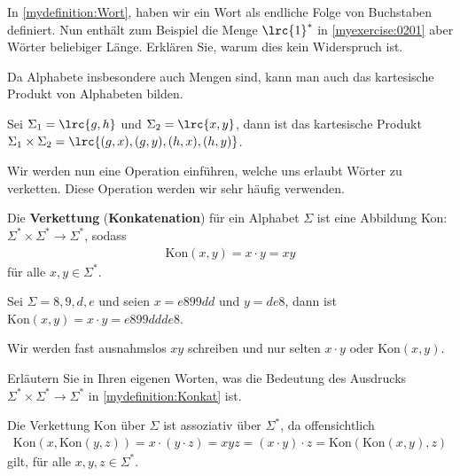 \begin{myexercise}\label{myexercise:0202}
	In \cref{mydefinition:Wort}, haben wir ein Wort als endliche Folge von Buchstaben definiert. Nun enthält zum Beispiel die Menge $\lrc{1}^{*}$ in \cref{myexercise:0201} aber Wörter beliebiger Länge. Erklären Sie, warum dies kein Widerspruch ist.
\end{myexercise}

Da Alphabete insbesondere auch Mengen sind, kann man auch das kartesische Produkt von Alphabeten bilden.

\begin{myexample}
Sei $\Sigma_1 = \lrc{g,h}$ und $\Sigma_2 = \lrc{x,y}$, dann ist das kartesische Produkt $\Sigma_1\times \Sigma_2 = \lrc{(g,x),(g,y),(h,x),(h,y)}$.
\end{myexample}

Wir werden nun eine Operation einführen, welche uns erlaubt Wörter zu verketten. Diese Operation werden wir sehr häufig verwenden.
\begin{mydefinition}\label{mydefinition:Konkat}
Die \textbf{Verkettung} (\textbf{Konkatenation}) für ein Alphabet $\Sigma$ ist eine Abbildung
Kon: $\Sigma^*\times \Sigma^*\rightarrow\Sigma^*$, sodass
\begin{align*}
	\text{Kon}(x,y) = x\cdot y = xy
\end{align*}
für alle $x,y\in\Sigma^{*}$.
\end{mydefinition}
\begin{myexample}
Sei $\Sigma = {8,9,d,e}$ und seien $x = e899dd$ und $y = de8$, dann ist $\text{Kon}(x,y) = x\cdot y = e899ddde8$.
\end{myexample}

Wir werden fast ausnahmslos $xy$ schreiben und nur selten $x\cdot y$ oder $\text{Kon}(x,y)$.

\begin{myexercise}\label{myexercise:0203}
	Erläutern Sie in Ihren eigenen Worten, was die Bedeutung des Ausdrucks $\Sigma^*\times \Sigma^*\rightarrow\Sigma^*$ in \cref{mydefinition:Konkat} ist.
\end{myexercise}

Die Verkettung $\text{Kon}$ über $\Sigma$ ist assoziativ über $\Sigma^*$, da offensichtlich
\begin{align*}
	\text{Kon}(x,\text{Kon}(y,z)) = x\cdot (y\cdot z) = xyz = (x\cdot y)\cdot z = \text{Kon}(\text{Kon}(x,y),z)
\end{align*}
gilt, für alle $x,y,z\in\Sigma^*$.

